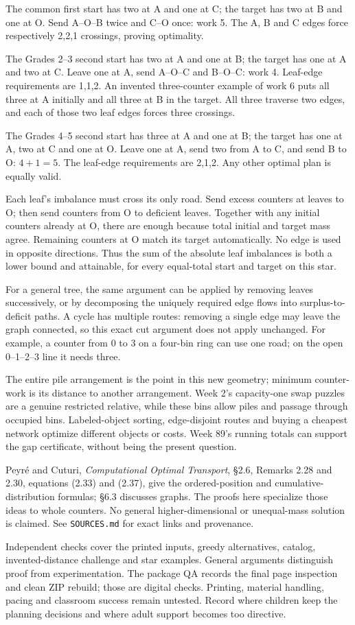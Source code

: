 The common first start has two at A and one at C; the target has two at B and one at O. Send A--O--B twice and C--O once: work 5. The A, B and C edges force respectively 2,2,1 crossings, proving optimality.

The Grades 2--3 second start has two at A and one at B; the target has one at A and two at C. Leave one at A, send A--O--C and B--O--C: work 4. Leaf-edge requirements are 1,1,2. An invented three-counter example of work 6 puts all three at A initially and all three at B in the target. All three traverse two edges, and each of those two leaf edges forces three crossings.

The Grades 4--5 second start has three at A and one at B; the target has one at A, two at C and one at O. Leave one at A, send two from A to C, and send B to O: $4+1=5$. The leaf-edge requirements are 2,1,2. Any other optimal plan is equally valid.

Each leaf's imbalance must cross its only road. Send excess counters at leaves to O; then send counters from O to deficient leaves. Together with any initial counters already at O, there are enough because total initial and target mass agree. Remaining counters at O match its target automatically. No edge is used in opposite directions. Thus the sum of the absolute leaf imbalances is both a lower bound and attainable, for every equal-total start and target on this star.

For a general tree, the same argument can be applied by removing leaves successively, or by decomposing the uniquely required edge flows into surplus-to-deficit paths. A cycle has multiple routes: removing a single edge may leave the graph connected, so this exact cut argument does not apply unchanged. For example, a counter from 0 to 3 on a four-bin ring can use one road; on the open 0--1--2--3 line it needs three.

The entire pile arrangement is the point in this new geometry; minimum counter-work is its distance to another arrangement. Week 2's capacity-one swap puzzles are a genuine restricted relative, while these bins allow piles and passage through occupied bins. Labeled-object sorting, edge-disjoint routes and buying a cheapest network optimize different objects or costs. Week 89's running totals can support the gap certificate, without being the present question.

Peyr\'e and Cuturi, \emph{Computational Optimal Transport}, \S2.6, Remarks 2.28 and 2.30, equations (2.33) and (2.37), give the ordered-position and cumulative-distribution formulas; \S6.3 discusses graphs. The proofs here specialize those ideas to whole counters. No general higher-dimensional or unequal-mass solution is claimed. See \texttt{SOURCES.md} for exact links and provenance.

Independent checks cover the printed inputs, greedy alternatives, catalog, invented-distance challenge and star examples. General arguments distinguish proof from experimentation. The package QA records the final page inspection and clean ZIP rebuild; those are digital checks. Printing, material handling, pacing and classroom success remain untested. Record where children keep the planning decisions and where adult support becomes too directive.
